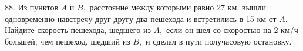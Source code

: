88. Из пунктов $A$ и $B,$ расстояние между которыми равно 27
км, вышли одновременно навстречу друг другу два
пешехода и встретились в 15 км от $A.$ Найдите скорость
пешехода, шедшего из $A,$ если он шел со скоростью на
2 км/ч большей, чем пешеход, шедший из $B,$ и сделал в
пути получасовую остановку.
\newpage
